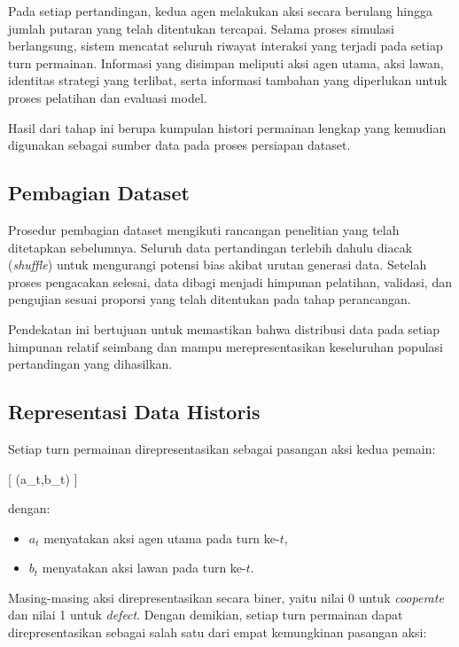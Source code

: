 Pada setiap pertandingan, kedua agen melakukan aksi secara berulang hingga jumlah putaran yang telah ditentukan tercapai. Selama proses simulasi berlangsung, sistem mencatat seluruh riwayat interaksi yang terjadi pada setiap turn permainan. Informasi yang disimpan meliputi aksi agen utama, aksi lawan, identitas strategi yang terlibat, serta informasi tambahan yang diperlukan untuk proses pelatihan dan evaluasi model.

Hasil dari tahap ini berupa kumpulan histori permainan lengkap yang kemudian digunakan sebagai sumber data pada proses persiapan dataset.

\subsection{Pembagian Dataset}

Prosedur pembagian dataset mengikuti rancangan penelitian yang telah ditetapkan sebelumnya. Seluruh data pertandingan terlebih dahulu diacak (\textit{shuffle}) untuk mengurangi potensi bias akibat urutan generasi data. Setelah proses pengacakan selesai, data dibagi menjadi himpunan pelatihan, validasi, dan pengujian sesuai proporsi yang telah ditentukan pada tahap perancangan.

Pendekatan ini bertujuan untuk memastikan bahwa distribusi data pada setiap himpunan relatif seimbang dan mampu merepresentasikan keseluruhan populasi pertandingan yang dihasilkan.

\subsection{Representasi Data Historis}

Setiap turn permainan direpresentasikan sebagai pasangan aksi kedua pemain:

[
(a_t,b_t)
]

dengan:

\begin{itemize}
\item $a_t$ menyatakan aksi agen utama pada turn ke-$t$,
\item $b_t$ menyatakan aksi lawan pada turn ke-$t$.
\end{itemize}

Masing-masing aksi direpresentasikan secara biner, yaitu nilai 0 untuk \textit{cooperate} dan nilai 1 untuk \textit{defect}. Dengan demikian, setiap turn permainan dapat direpresentasikan sebagai salah satu dari empat kemungkinan pasangan aksi:

